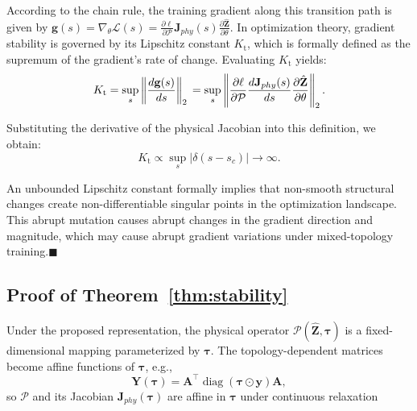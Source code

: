 \documentclass[journal]{IEEEtran}
\begin{document}
According to the chain rule, the training gradient along this transition path is given by $\mathbf{g}(s) = \nabla_{\theta}\mathcal{L}(s) = \frac{\partial \ell}{\partial \mathcal{P}} \mathbf{J}_{phy}(s) \frac{\partial \hat{\mathbf{Z}}}{\partial \theta}$. In optimization theory, gradient stability is governed by its Lipschitz constant $K_{\text{t}}$, which is formally defined as the supremum of the gradient's rate of change. Evaluating $K_{\text{t}}$ yields:
\begin{equation}
K_{\text{t}} = \sup_{s} \left\| \frac{d\mathbf{g}(s)}{ds} \right\|_2 \\
= \sup_{s} \left\| \frac{\partial \ell}{\partial \mathcal{P}} \frac{d\mathbf{J}_{phy}(s)}{ds} \frac{\partial \hat{\mathbf{Z}}}{\partial \theta} \right\|_2.
\end{equation}

Substituting the derivative of the physical Jacobian into this definition, we obtain:
\begin{equation}
K_{\text{t}} \propto \sup_{s} |\delta(s-s_c)| \to \infty.
\end{equation}

An unbounded Lipschitz constant formally implies that non-smooth structural changes create non-differentiable singular points in the optimization landscape. This abrupt mutation causes abrupt changes in the gradient direction and magnitude, which may cause abrupt gradient variations under mixed-topology training.\hfill $\blacksquare$

\subsection{Proof of Theorem~\ref{thm:stability}}

Under the proposed representation, the physical operator $\mathcal{P}(\hat{\mathbf{Z}},\boldsymbol{\tau})$ is a fixed-dimensional mapping parameterized by $\boldsymbol{\tau}$. The topology-dependent matrices become affine functions of $\boldsymbol{\tau}$, e.g.,
\begin{equation}
\mathbf{Y}(\boldsymbol{\tau})=\mathbf{A}^{\top}\operatorname{diag}(\boldsymbol{\tau}\odot\mathbf{y})\mathbf{A},
\end{equation}
so $\mathcal{P}$ and its Jacobian $\mathbf{J}_{phy}(\boldsymbol{\tau})$ are affine in $\boldsymbol{\tau}$ under continuous relaxation
\end{document}
